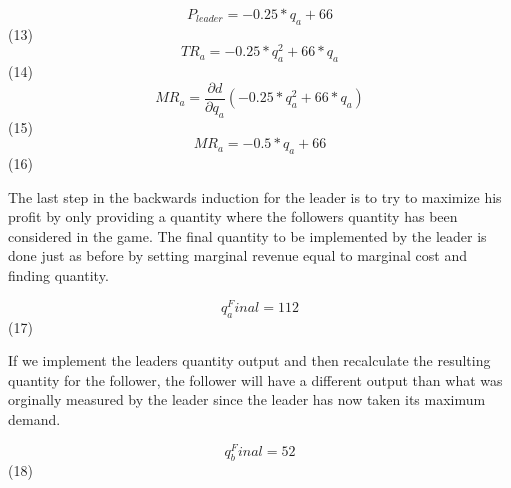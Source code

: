 $$ P_{leader} = -0.25*q_{a} + 66$$ (13)
$$ TR_{a} = -0.25*q_{a}^2 + 66*q_{a}$$ (14)
$$ MR_{a} = \frac{\partial d}{\partial q_{a}}(-0.25*q_{a}^2 + 66*q_{a})$$ (15)
$$ MR_{a} = -0.5*q_{a} + 66$$ (16)

The last step in the backwards induction for the leader is to try to 
maximize his profit by only providing a quantity where the followers 
quantity has been considered in the game. The final quantity to be 
implemented by the leader is done just as before by setting marginal 
revenue equal to marginal cost and finding quantity.

$$ q_{a}^Final = 112$$ (17)

If we implement the leaders quantity output and then recalculate 
the resulting quantity for the follower, the follower will have a 
different output than what was orginally measured by the leader 
since the leader has now taken its maximum demand.

$$ q_{b}^Final = 52$$ (18)
